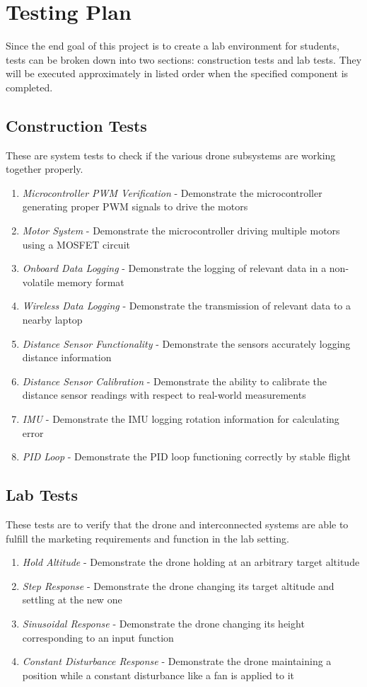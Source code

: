 \documentclass[12pt, titlepage]{article}
\begin{document}
\section{Testing Plan}
Since the end goal of this project is to create a lab environment for students, tests can be broken down into two sections: construction tests and lab tests. They will be executed approximately in listed order when the specified component is completed.

\subsection{Construction Tests}
These are system tests to check if the various drone subsystems are working together properly.

\begin{enumerate}
	\item \textit{Microcontroller PWM Verification} - Demonstrate the microcontroller generating proper PWM signals to drive the motors
	\item \textit{Motor System} - Demonstrate the microcontroller driving multiple motors using a MOSFET circuit
	\item \textit{Onboard Data Logging} - Demonstrate the logging of relevant data in a non-volatile memory format
	\item \textit{Wireless Data Logging} - Demonstrate the transmission of relevant data to a nearby laptop
	\item \textit{Distance Sensor Functionality} - Demonstrate the sensors accurately logging distance information
	\item \textit{Distance Sensor Calibration} - Demonstrate the ability to calibrate the distance sensor readings with respect to real-world measurements
	\item \textit{IMU} - Demonstrate the IMU logging rotation information for calculating error
	\item \textit{PID Loop} - Demonstrate the PID loop functioning correctly by stable flight
\end{enumerate}

\subsection{Lab Tests}
These tests are to verify that the drone and interconnected systems are able to fulfill the marketing requirements and function in the lab setting.

\begin{enumerate}
	\item \textit{Hold Altitude} - Demonstrate the drone holding at an arbitrary target altitude
	\item \textit{Step Response} - Demonstrate the drone changing its target altitude and settling at the new one
	\item \textit{Sinusoidal Response} - Demonstrate the drone changing its height corresponding to an input function
	\item \textit{Constant Disturbance Response} - Demonstrate the drone maintaining a position while a constant disturbance like a fan is applied to it
\end{enumerate}
\end{document}
